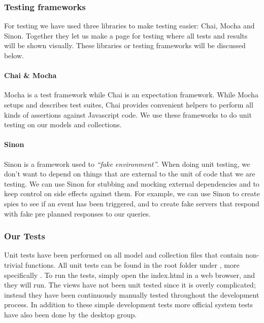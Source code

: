 \subsubsection{Testing frameworks}
For testing we have used three libraries to make testing easier: Chai, Mocha and Sinon. Together they let us make a page for testing where all tests and results will be shown visually.
These libraries or testing frameworks will be discussed below.
\paragraph{Chai \& Mocha}
Mocha\cite{web_8} is a test framework while Chai\cite{web_7} is an expectation framework. While Mocha setups and describes test suites, Chai provides convenient helpers to perform all kinds of assertions against Javascript code. We use these frameworks to do unit testing on our models and collections.

\paragraph{Sinon}
Sinon\cite{web_9} is a framework used to \textit{“fake environment”}. When doing unit testing, we don’t want to depend on things that are external to the unit of code that we are testing. We can use Sinon for stubbing and mocking external dependencies and to keep control on side effects against them. For example, we can use Sinon to create spies to see if an event has been triggered, and to create fake servers that respond with fake pre planned responses to our queries.

\subsubsection{Our Tests}
Unit tests have been performed on all model and collection files that contain non-trivial functions. All unit tests can be found in the root folder under , more specifically . To run the tests, simply open the index.html in a web browser, and they will run. The views have not been unit tested since it is overly complicated; instead they have been continuously manually tested throughout the development process. In addition to these simple development tests more official system tests have also been done by the desktop group.